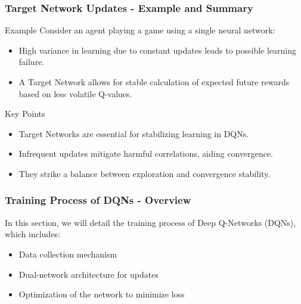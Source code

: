\documentclass[aspectratio=169]{beamer}
\begin{document}
\begin{frame}[fragile]
    \frametitle{Target Network Updates - Example and Summary}
    \begin{block}{Example}
        Consider an agent playing a game using a single neural network:
        \begin{itemize}
            \item High variance in learning due to constant updates leads to possible learning failure.
            \item A Target Network allows for stable calculation of expected future rewards based on less volatile Q-values.
        \end{itemize}
    \end{block}

    \begin{block}{Key Points}
        \begin{itemize}
            \item Target Networks are essential for stabilizing learning in DQNs.
            \item Infrequent updates mitigate harmful correlations, aiding convergence.
            \item They strike a balance between exploration and convergence stability.
        \end{itemize}
    \end{block}
\end{frame}

\begin{frame}[fragile]
    \frametitle{Training Process of DQNs - Overview}
    In this section, we will detail the training process of Deep Q-Networks (DQNs), which includes:
    \begin{itemize}
        \item Data collection mechanism
        \item Dual-network architecture for updates
        \item Optimization of the network to minimize loss
    \end{itemize}
\end{frame}
\end{document}
